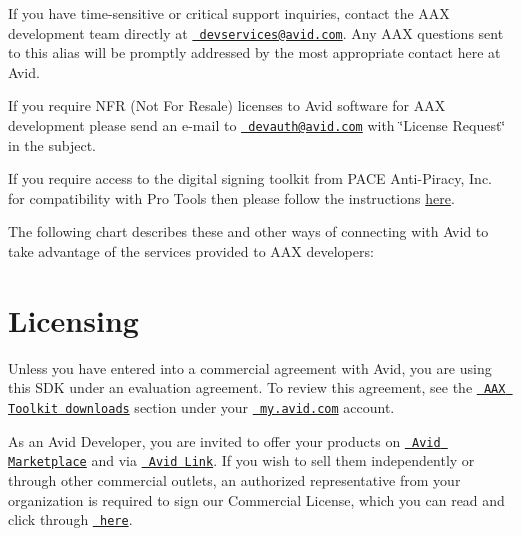 If you have time-\/sensitive or critical support inquiries, contact the A\+AX development team directly at \href{mailto:devservices@avid.com}{\texttt{ devservices@avid.\+com}}. Any A\+AX questions sent to this alias will be promptly addressed by the most appropriate contact here at Avid.

If you require N\+FR (Not For Resale) licenses to Avid software for A\+AX development please send an e-\/mail to \href{mailto:devauth@avid.com?subject=License Request}{\texttt{ devauth@avid.\+com}} with \char`\"{}\+License Request\char`\"{} in the subject.

If you require access to the digital signing toolkit from P\+A\+CE Anti-\/\+Piracy, Inc. for compatibility with Pro Tools then please follow the instructions \mbox{\hyperlink{a00830_subsection__digital_signature_}{here}}.

The following chart describes these and other ways of connecting with Avid to take advantage of the services provided to A\+AX developers\+:

 \hypertarget{a00793_welcome_licensing}{}\section{Licensing}\label{a00793_welcome_licensing}
Unless you have entered into a commercial agreement with Avid, you are using this S\+DK under an evaluation agreement. To review this agreement, see the \href{https://my.avid.com/products/cppsdk?toolkit=AAX}{\texttt{ A\+AX Toolkit downloads}} section under your \href{https://my.avid.com}{\texttt{ my.\+avid.\+com}} account.

As an Avid Developer, you are invited to offer your products on \href{https://shop.avid.com/}{\texttt{ Avid Marketplace}} and via \href{https://www.avid.com/products/avid-link}{\texttt{ Avid Link}}. If you wish to sell them independently or through other commercial outlets, an authorized representative from your organization is required to sign our Commercial License, which you can read and click through \href{http://www.avid.com/alliance-partner-program/how-to-apply}{\texttt{ here}}. 